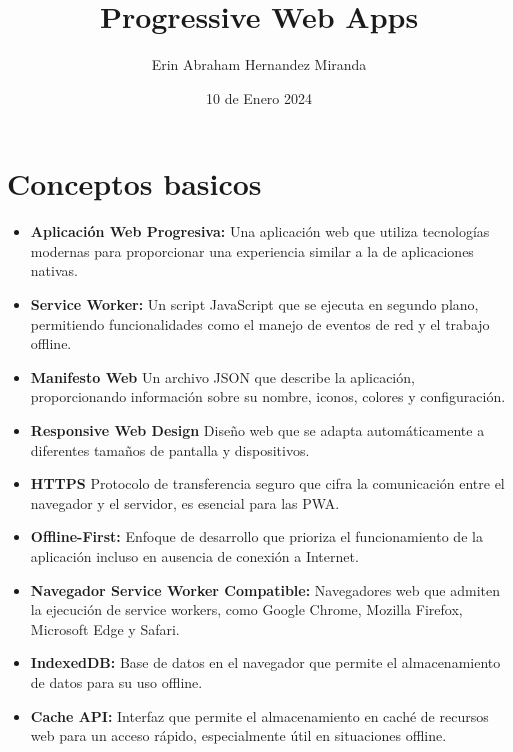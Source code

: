 \documentclass{article}
\title{Progressive Web Apps}
\author{Erin Abraham Hernandez Miranda}
\date{10 de Enero 2024}
\begin{document}
\maketitle

\newpage

\section*{Conceptos basicos}
\begin{itemize}
    \item\textbf{Aplicación Web Progresiva:}
    Una aplicación web que utiliza tecnologías modernas para proporcionar una experiencia similar a la de aplicaciones nativas.
    \item\textbf{Service Worker:}
    Un script JavaScript que se ejecuta en segundo plano, permitiendo funcionalidades como el manejo de eventos de red y el trabajo offline.
    \item\textbf{Manifesto Web}
    Un archivo JSON que describe la aplicación, proporcionando información sobre su nombre, iconos, colores y configuración.
    \item\textbf{Responsive Web Design}
    Diseño web que se adapta automáticamente a diferentes tamaños de pantalla y dispositivos.
    \item\textbf{HTTPS}
    Protocolo de transferencia seguro que cifra la comunicación entre el navegador y el servidor, es esencial para las PWA.
    \item\textbf{Offline-First:}
    Enfoque de desarrollo que prioriza el funcionamiento de la aplicación incluso en ausencia de conexión a Internet.
    \item\textbf{Navegador Service Worker Compatible:}
    Navegadores web que admiten la ejecución de service workers, como Google Chrome, Mozilla Firefox, Microsoft Edge y Safari.
    \item\textbf{IndexedDB:}
    Base de datos en el navegador que permite el almacenamiento de datos para su uso offline.
    \item\textbf{Cache API:}
    Interfaz que permite el almacenamiento en caché de recursos web para un acceso rápido, especialmente útil en situaciones offline.
\end{itemize}

\newpage
\end{document}
